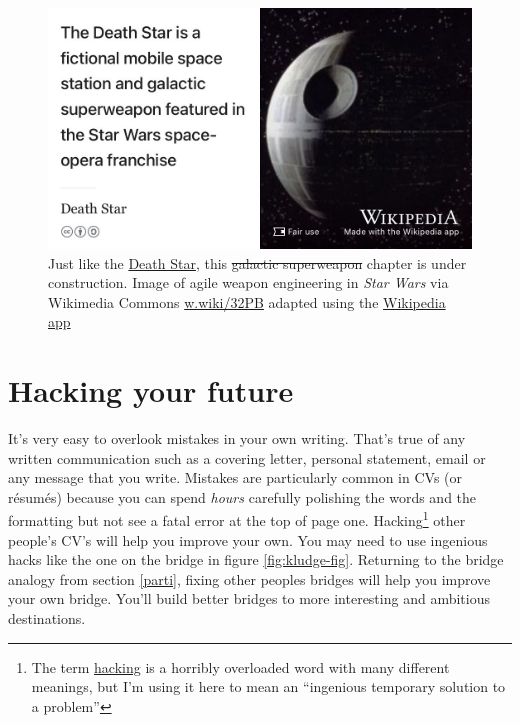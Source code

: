 \documentclass[
]{book}
\begin{document}
\begin{figure}

{\centering \includegraphics[width=0.99\linewidth]{images/DeathStar2} 

}

\caption{Just like the \href{https://en.wikipedia.org/wiki/Death_Star}{Death Star}, this \sout{galactic superweapon} chapter is under construction. Image of agile weapon engineering in \emph{Star Wars} via Wikimedia Commons \href{https://w.wiki/32PB}{w.wiki/32PB} adapted using the \href{https://apps.apple.com/gb/app/wikipedia/id324715238}{Wikipedia app}}\label{fig:deathstar19-fig}
\end{figure}

\hypertarget{hacking}{%
\chapter{Hacking your future}\label{hacking}}

It's very easy to overlook mistakes in your own writing. That's true of any written communication such as a covering letter, personal statement, email or any message that you write. Mistakes are particularly common in CVs (or résumés) because you can spend \emph{hours} carefully polishing the words and the formatting but not see a fatal error at the top of page one. Hacking\footnote{The term \href{https://en.wikipedia.org/wiki/Hacker_(disambiguation)}{hacking} is a horribly overloaded word with many different meanings, but I'm using it here to mean an ``ingenious temporary solution to a problem''} other people's CV's will help you improve your own. You may need to use ingenious hacks like the one on the bridge in figure \ref{fig:kludge-fig}. Returning to the bridge analogy from section \ref{parti}, fixing other peoples bridges will help you improve your own bridge. You'll build better bridges to more interesting and ambitious destinations.
\end{document}
